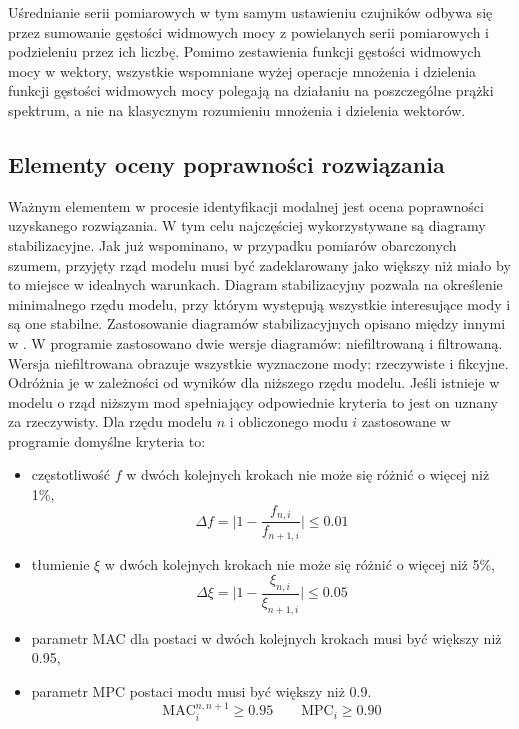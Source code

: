 Uśrednianie serii pomiarowych w tym samym ustawieniu czujników odbywa się przez sumowanie gęstości widmowych mocy z powielanych serii pomiarowych i podzieleniu przez ich liczbę. Pomimo zestawienia funkcji gęstości widmowych mocy w wektory, wszystkie wspomniane wyżej operacje mnożenia i dzielenia funkcji gęstości widmowych mocy polegają na działaniu na poszczególne prążki spektrum, a nie na klasycznym rozumieniu mnożenia i dzielenia wektorów.

\subsection{Elementy oceny poprawności rozwiązania}
Ważnym elementem w procesie identyfikacji modalnej jest ocena poprawności uzyskanego rozwiązania. W tym celu najczęściej wykorzystywane są diagramy stabilizacyjne. Jak już wspominano, w przypadku pomiarów obarczonych szumem, przyjęty rząd modelu musi być zadeklarowany jako większy niż miało by to miejsce w idealnych warunkach. Diagram stabilizacyjny pozwala na określenie minimalnego rzędu modelu, przy którym występują wszystkie interesujące mody i są one stabilne. Zastosowanie diagramów stabilizacyjnych opisano między innymi w \parencite{Dudek2008,Caicedo2011,Szafranski2013,Neu2017,Favarelli2021}. W programie zastosowano dwie wersje diagramów: niefiltrowaną i filtrowaną. Wersja niefiltrowana obrazuje wszystkie wyznaczone mody: rzeczywiste i fikcyjne. Odróżnia je w zależności od wyników dla niższego rzędu modelu. Jeśli istnieje w modelu o rząd niższym mod spełniający odpowiednie kryteria to jest on uznany za rzeczywisty. Dla rzędu modelu $n$ i obliczonego modu $i$ zastosowane w programie domyślne kryteria to:
\begin{itemize}
	\item częstotliwość $f$ w dwóch kolejnych krokach nie może się różnić o więcej niż 1\%,
	\begin{equation}\label{eq: stabdiag_crit_freq}
		\Delta f =  \Big| 1-\frac{f_{n,i}}{f_{n+1,i}}\Big|  \le 0.01
	\end{equation}
	\item tłumienie $\xi$ w dwóch kolejnych krokach nie może się różnić o więcej niż 5\%,
		\begin{equation}\label{eq: stabdiag_crit_ksi}
		\Delta \xi =  \Big| 1-\frac{\xi_{n,i}}{\xi_{n+1,i}}\Big|  \le 0.05
	\end{equation}
	\item parametr MAC dla postaci w dwóch kolejnych krokach musi być większy niż 0.95,	
	\item parametr MPC postaci modu musi być większy niż 0.9.
	\begin{equation}\label{eq: stabdiag_crit_MPC_MAC}
		\text{MAC}_i^{n,n+1} \ge 0.95 \qquad \text{MPC}_i \ge 0.90
	\end{equation}
\end{itemize}
